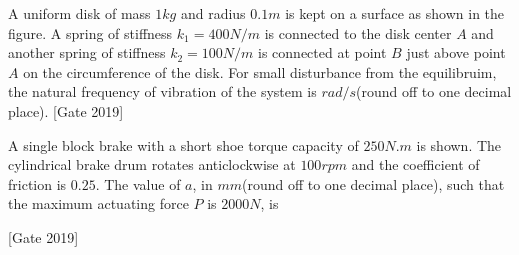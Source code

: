 \iffalse
	\author{ai24btech11019}
	\section{me}
	\chapter{2019}
\fi
	\item A uniform disk of mass $1kg$ and radius $0.1m$ is kept on a surface as shown in the figure. A spring of stiffness $k_1 = 400N/m$ is connected to the disk center $A$ and another spring of stiffness $k_2 = 100N/m$ is connected at point $B$ just above point $A$ on the circumference of the disk. For small disturbance from the equilibruim, the natural frequency of vibration of the system is \underline{\hspace{2cm}} $rad/s$(round off to one decimal place).
		\hfill{[Gate 2019]}
	\item A single block brake with a short shoe torque capacity of $250 N.m$ is shown. The cylindrical brake drum rotates anticlockwise at $100rpm$ and the coefficient of friction is $0.25$. The value of $a$, in $mm$(round off to one decimal place), such that the maximum actuating force $P$ is $2000N$, is \underline{\hspace{2cm}}
	
		\hfill{[Gate 2019]}
	

